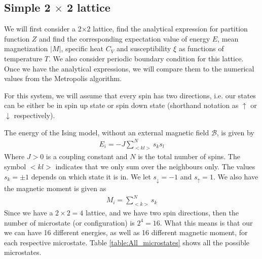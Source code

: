 \documentclass[12pt]{article}
\begin{document}
\subsection{Simple 2 $\times$ 2 lattice}
We will first consider a 2$\times$2 lattice, find the analytical expression for partition function $Z$ and find the corresponding expectation value of energy $E$, mean magnetization $|M|$, specific heat $C_V$ and susceptibility $\xi$ as functions of temperature $T$. We also consider periodic boundary condition for this lattice. Once we have the analytical expressions, we will compare them to the numerical values from the Metropolis algorithm.

For this system, we will assume that every spin has two directions, i.e. our states can be either be in spin up state or spin down state (shorthand notation as $\uparrow$ or $\downarrow$ respectively).

The energy of the Ising model, without an external magnetic field $\mathcal{B}$, is given by
\begin{align*}
E_i = \displaystyle -J \sum_{<kl>}^Ns_k s_l
\end{align*} 
Where $J > 0$ is a coupling constant and $N$ is the total number of spins. The symbol $<kl>$ indicates that we only sum over the neighbours only. The values $s_k = \pm 1$ depends on which state it is in. We let $s_{\downarrow} = -1$ and $s_{\uparrow} = 1$. We also have the magnetic moment is given as
\begin{align*}
M_i = \displaystyle \sum_{<k>}^N s_k
\end{align*}
Since we have a $2\times2=4$ lattice, and we have two spin directions, then the number of microstate (or configuration) is $2^4 = 16$. What this means is that our we can have 16 different energies, as well as 16 different magnetic moment, for each respective microstate. Table \ref{table:All_microstates} shows all the possible microstates.
\end{document}
